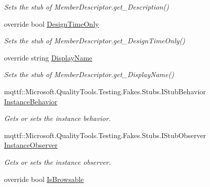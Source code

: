 \begin{DoxyCompactItemize}
\begin{DoxyCompactList}\small\item\em Sets the stub of Member\-Descriptor.\-get\-\_\-\-Description()\end{DoxyCompactList}\item 
override bool \hyperlink{class_system_1_1_component_model_1_1_fakes_1_1_stub_member_descriptor_a426798fbd0f20dd62eddd959f62077e0}{Design\-Time\-Only}
\begin{DoxyCompactList}\small\item\em Sets the stub of Member\-Descriptor.\-get\-\_\-\-Design\-Time\-Only()\end{DoxyCompactList}\item 
override string \hyperlink{class_system_1_1_component_model_1_1_fakes_1_1_stub_member_descriptor_aee068f412343aa0e7f27258e20007de5}{Display\-Name}
\begin{DoxyCompactList}\small\item\em Sets the stub of Member\-Descriptor.\-get\-\_\-\-Display\-Name()\end{DoxyCompactList}\item 
mqttf\-::\-Microsoft.\-Quality\-Tools.\-Testing.\-Fakes.\-Stubs.\-I\-Stub\-Behavior \hyperlink{class_system_1_1_component_model_1_1_fakes_1_1_stub_member_descriptor_abca45706d93f7336116edc52828dd2ac}{Instance\-Behavior}
\begin{DoxyCompactList}\small\item\em Gets or sets the instance behavior.\end{DoxyCompactList}\item 
mqttf\-::\-Microsoft.\-Quality\-Tools.\-Testing.\-Fakes.\-Stubs.\-I\-Stub\-Observer \hyperlink{class_system_1_1_component_model_1_1_fakes_1_1_stub_member_descriptor_a0634e02903a813f6925f9a5386a0c6cf}{Instance\-Observer}
\begin{DoxyCompactList}\small\item\em Gets or sets the instance observer.\end{DoxyCompactList}\item 
override bool \hyperlink{class_system_1_1_component_model_1_1_fakes_1_1_stub_member_descriptor_a372cc13ca5ede7409bf36958199fcce5}{Is\-Browsable}

\end{DoxyCompactItemize}
